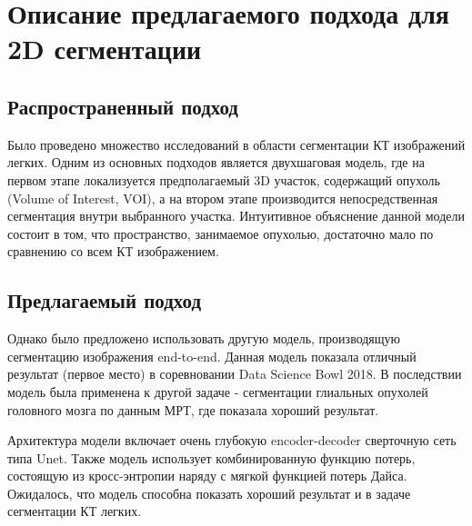 \chapter{Описание предлагаемого подхода для 2D сегментации}

\section{Распространенный подход}

Было проведено множество исследований в области сегментации КТ изображений легких. Одним из основных подходов является двухшаговая модель, где на первом этапе локализуется предполагаемый 3D участок, содержащий опухоль (Volume of Interest, VOI), а на втором этапе производится непосредственная сегментация внутри выбранного участка. Интуитивное объяснение данной модели состоит в том, что пространство, занимаемое опухолью, достаточно мало по сравнению со всем КТ изображением.

\section{Предлагаемый подход}

Однако было предложено использовать другую модель, производящую сегментацию изображения end-to-end. Данная модель показала отличный результат (первое место) в соревновании Data Science Bowl 2018. В последствии модель была применена к другой задаче - сегментации глиальных опухолей головного мозга по данным МРТ, где показала хороший результат.

Архитектура модели включает очень глубокую encoder-decoder сверточную сеть типа Unet. Также модель использует комбинированную функцию потерь, состоящую из кросс-энтропии наряду с мягкой функцией потерь Дайса. Ожидалось, что модель способна показать хороший результат и в задаче сегментации КТ легких.